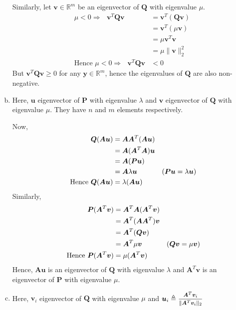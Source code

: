 \documentclass[a4paper]{article}
\begin{document}
\begin{enumerate}[(a)]
	Similarly, let $\bm{v}\in\mathbb{R}^m$ be an eigenvector of $\bm{Q}$ with eigenvalue $\mu$.
	\begin{equation}
		\begin{aligned}
			\text{$\mu<0\Rightarrow$ } \bm{v}^T\bm{Q}\bm{v}
			&=\bm{v}^T(\bm{Q}\bm{v})\\
			&=\bm{v}^T(\mu\bm{v})\\
			&=\mu\bm{v}^T\bm{v}\\
			&=\mu\|\bm{v}\|_2^2\\
			\text{Hence $\mu<0\Rightarrow$ }\bm{v}^T\bm{Q}\bm{v}&<0
		\end{aligned}
	\end{equation}
	But $\bm{v}^T\bm{Q}\bm{v}\geq0$ for any $\bm{y}\in\mathbb{R}^m$, hence the eigenvalues of $\bm{Q}$ are also non-negative.
	\item Here, $\bm{u}$ eigenvector of $\bm{P}$ with eigenvalue $\lambda$ and $\bm{v}$ eigenvector of $\bm{Q}$ with eigenvalue $\mu$. 
 	They have $n$ and $m$ elements respectively. 

	Now, 
	\begin{equation}
		\begin{aligned}
			\bm{Q}(\bm{A}\bm{u})
			&=\bm{A}\bm{A}^T(\bm{A}\bm{u})\\
			&=\bm{A}(\bm{A}^T\bm{A})\bm{u}\\
			&=\bm{A}(\bm{P}\bm{u})\\
			&=\bm{A}\lambda\bm{u}&\hfill{(\text{$\bm{P}\bm{u}=\lambda\bm{u}$})}\\
			\text{ Hence }\bm{Q}(\bm{A}\bm{u})&=\lambda(\bm{A}\bm{u})\\
		\end{aligned}
	\end{equation}
	Similarly, 
	\begin{equation}
		\begin{aligned}
			\bm{P}(\bm{A}^T\bm{v})
			&=\bm{A}^T\bm{A}(\bm{A}^T\bm{v})\\
			&=\bm{A}^T(\bm{A}\bm{A}^T)\bm{v}\\
			&=\bm{A}^T(\bm{Q}\bm{v})\\
			&=\bm{A}^T\mu\bm{v}&\hfill{(\text{$\bm{Q}\bm{v}=\mu\bm{v}$})}\\
			\text{ Hence }\bm{P}(\bm{A}^T\bm{v})&=\mu(\bm{A}^T\bm{v})\\
		\end{aligned}
	\end{equation}
	Hence, $\bm{A}\bm{u}$ is an eigenvector of $\bm{Q}$ with eigenvalue $\lambda$ and $\bm{A}^T\bm{v}$ is an eigenvector of $\bm{P}$ with eigenvalue $\mu$.
	\item {\label{itm:c}}
	Here, $\bm{v}_i$ eigenvector of $\bm{Q}$ with eigenvalue $\mu$ and $\bm{u}_i\triangleq\mfrac{\bm{A}^T \bm{v}_i}{\|\bm{A}^T \bm{v}_i\|_2}$


\end{enumerate}
\end{document}
